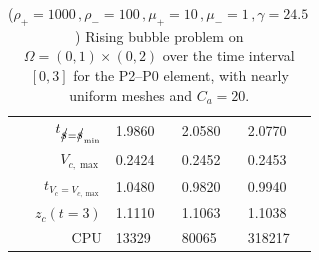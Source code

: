 \begin{table}
\begin{tabular}{rlll}
$t_{\strikes = \strikes_{\min}}$ & 1.9860 & 2.0580 & 2.0770 \\
$V_{c,\max}$                     & 0.2424 & 0.2452 & 0.2453 \\
$t_{V_c = V_{c,\max}}$           & 1.0480 & 0.9820 & 0.9940 \\
$z_c(t=3)$                       & 1.1110 & 1.1063 & 1.1038 \\
CPU                              &  13329 &  80065 & 318217 \\
\hline
\end{tabular}
\hspace*{-3.25cm}
\caption[Navier--Stokes 2d rising bubble benchmark values P2--P0]
{($\rho_+ = 1000\,,\rho_- = 100\,,\mu_+ = 10\,,\mu_- =1\,,\gamma = 24.5\,$)
Rising bubble problem on ${\Omega = (0,1) \times (0,2)}$ over the time interval
$[0,3]$ for the P2--P0 element, with nearly uniform meshes and
$C_a=20$\textdegree.}
\label{tab:risingbubble2Dp2p0}
\end{table}

